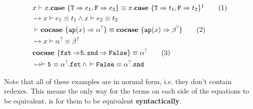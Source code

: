 \documentclass[twoside,12pt,a4paper]{article}
\begin{document}
\begin{example}
    \begin{align*}
    &x\vdash x.\expatmatch{\texttt{T} \Rightarrow e_1, \texttt{F} \Rightarrow e_2} \equiv x.\expatmatch{\texttt{T} \Rightarrow t_1, \texttt{F} \Rightarrow t_2}\footnotemark[1]\tag{1}
    \\ &\mapsto x\vdash  e_1 \equiv t_1\wedge x\vdash e_2\equiv t_2\\
    &\vdash \excopatmatch{\ap{x}\Rightarrow \alphaunifvar} \equiv \excopatmatch{\ap{x}\Rightarrow\betaunifvar} \tag{2}
    \\ &\mapsto x\vdash \alphaunifvar \equiv \betaunifvar\\
    &\excopatmatch{\mathtt{fst \Rightarrow} \mathtt{5}, \mathtt{snd\Rightarrow False}}\equiv \alphaunifvar \tag{3}
    \\ &\mapsto \vdash \mathtt{5}\equiv \alphaunifvar.\mathtt{fst}\, \wedge \,\vdash \mathtt{False\equiv\alphaunifvar.snd}
    \end{align*}
\end{example}
Note that all of these examples are in normal form, i.e. they don't contain redexes.
This means the only way for the terms on each side of the equations to be equivalent,
is for them to be equivalent \textbf{syntactically}. 
\end{document}
